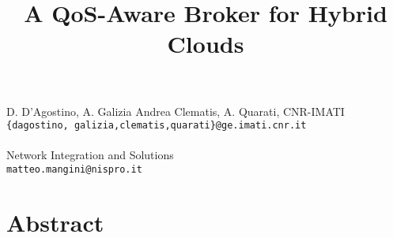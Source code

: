 \title{A QoS-Aware Broker for Hybrid Clouds}
 \author{} \institute{}
\maketitle
\begin{center}
{\large D. D'Agostino, A. Galizia Andrea Clematis, A. Quarati}, 
CNR-IMATI\\
{\tt \{dagostino, galizia,clematis,quarati\}@ge.imati.cnr.it}
\\ \vspace{4mm}{\large Matteo Mangini}\\
Network Integration and Solutions\\
{\tt matteo.mangini@nispro.it}

\end{center}

\section*{Abstract}

